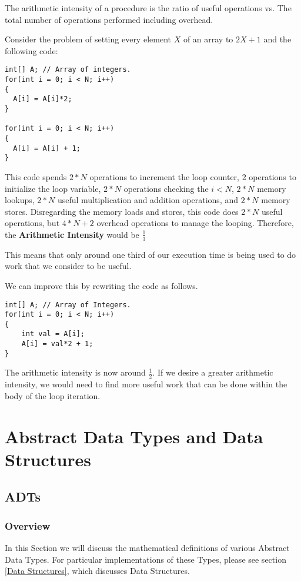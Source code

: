 \documentclass[12pt, letterpaper]{book}
\begin{document}
The arithmetic intensity of a procedure is the ratio of useful operations vs. The total number of operations performed including overhead.

Consider the problem of setting every element $X$ of an array to $2X + 1$ and the following code:

\begin{verbatim}
int[] A; // Array of integers.
for(int i = 0; i < N; i++)
{
  A[i] = A[i]*2;
}

for(int i = 0; i < N; i++)
{
  A[i] = A[i] + 1;
}
\end{verbatim}

This code spends $2*N$ operations to increment the loop counter, 2 operations to initialize the loop variable, $2*N$ operations checking the $i < N$, $2*N$ memory lookups, $2*N$ useful multiplication and addition operations, and $2*N$ memory stores.
Disregarding the memory loads and stores, this code does $2*N$ useful operations, but $4*N + 2$ overhead operations to manage the looping. Therefore, the \textbf{Arithmetic Intensity} would be $\frac{1}{3}$

This means that only around one third of our execution time is being used to do work that we consider to be useful.

We can improve this by rewriting the code as follows.
\begin{verbatim}
int[] A; // Array of Integers.
for(int i = 0; i < N; i++)
{
	int val = A[i];
	A[i] = val*2 + 1;
}
\end{verbatim}

The arithmetic intensity is now around $\frac{1}{2}$. If we desire a greater arithmetic intensity, we would need to find more useful work that can be done within the body of the loop iteration.

\part{Abstract Data Types and Data Structures}

\chapter{ADTs} \label{ADTs}

	\section{Overview}

	In this Section we will discuss the mathematical definitions of various Abstract Data Types. For particular implementations of these Types, please see section \ref{Data Structures}, which discusses Data Structures.
\end{document}
